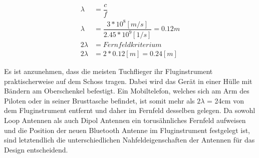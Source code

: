 \begin{eqnarray}
\lambda &=\dfrac{c}{f} \label{eq:Fernfeld1}\\
\lambda &=\dfrac{3*10^{8} [m/s]}{2.45*10^{9} [1/s]}=0.12m\\ 
2\lambda &= Fernfeldkriterium\\ 
2\lambda &= 2*0.12[m] =0.24 [m] \label{eq:Fernfeld}
\end{eqnarray}

Es ist anzunehmen, dass die meisten Tuchflieger ihr Fluginstrument praktischerweise auf dem Schoss tragen. Dabei wird das Gerät in einer Hülle mit Bändern am Oberschenkel befestigt. Ein Mobiltelefon, welches sich am Arm des Piloten oder in seiner Brusttasche befindet, ist somit mehr als $2\lambda$ = 24cm von dem Fluginstrument entfernt und daher im Fernfeld desselben gelegen. Da sowohl Loop Antennen als auch Dipol Antennen ein torusähnliches Fernfeld aufweisen und die Position der neuen Bluetooth Antenne im Fluginstrument festgelegt ist, sind letztendlich die unterschiedlichen Nahfeldeigenschaften der Antennen für das Design entscheidend.

